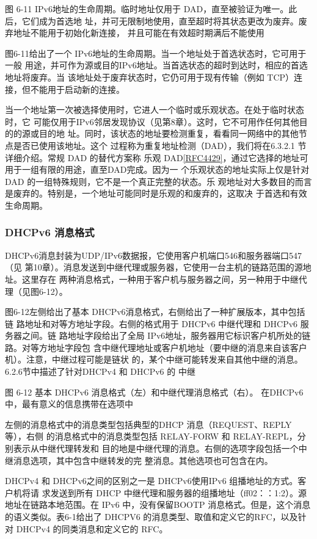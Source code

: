 图 6-11
IPv6地址的生命周期。临时地址仅用于 DAD，直至被验证为唯一。此后，它们成为首选地
址，并可无限制地使用，直至超时将其状态更改为废弃。废弃地址不能用于初始化新连接，
并且可能在有效超时期满后不能使用

图6-11给出了一个 IPv6地址的生命周期。当一个地址处于首选状态时，它可用于一般
用途，并可作为源或目的IPv6地址。当首选状态的超时到达时，相应的首选地址将废弃。当
该地址处于废弃状态时，它仍可用于现有传输（例如 TCP）连接，但不能用于启动新的连接。

当一个地址第一次被选择使用时，它进人一个临时或乐观状态。在处于临时状态时，它
可能仅用于IPv6邻居发现协议（见第8章）。这时，它不可用作任何其他目的的源或目的地
址。同时，该状态的地址要检测重复，看看同一网络中的其他节点是否已使用该地址。这个
过程称为重复地址检测（DAD），我们将在6.3.2.1 节详细介绍。常规 DAD 的替代方案称
乐观 DAD\href{https://www.rfc-editor.org/rfc/rfc4429}{\href{https://www.rfc-editor.org/rfc/rfc4429}{[RFC4429]}}，通过它选择的地址可用于一组有限的用途，直至DAD完成。因为一
个乐观状态的地址实际上仅是针对 DAD 的一组特殊规则，它不是一个真正完整的状态。乐
观地址对大多数目的而言是废弃的。特别是，一个地址可能同时是乐观的和废弃的，这取决
于首选和有效生命周期。

\subsubsection{DHCPv6 消息格式}
DHCPv6消息封装为UDP/IPv6数据报，它使用客户机端口546和服务器端口547（见
第10章）。消息发送到中继代理或服务器，它使用一台主机的链路范围的源地址。这里存在
两种消息格式，一种用于客户机与服务器之间，另一种用于中继代理（见图6-12）。

图6-12左侧给出了基本 DHCPv6消息格式，右侧给出了一种扩展版本，其中包括链
路地址和对等方地址字段。右侧的格式用于 DHCPv6 中继代理和 DHCPv6 服务器之间。链
路地址字段给出了全局 IPv6地址，服务器用它标识客户机所处的链路。对等方地址字段包
含中继代理地址或客户机地址（要中继的消息来自该客户机）。注意，中继过程可能是链状
的，某个中继可能转发来自其他中继的消息。6.2.6节中描述了针对DHCPv4 和 DHCPv6 的
中继

图 6-12
基本 DHCPv6 消息格式（左）和中继代理消息格式（右）。
在DHCPv6中，最有意义的信息携带在选项中

左侧的消息格式中的消息类型包括典型的DHCP 消息（REQUEST、REPLY 等），右侧
的消息格式中的消息类型包括 RELAY-FORW 和 RELAY-REPL，分别表示从中继代理转发和
目的地是中继代理的消息。右侧的选项字段包括一个中继消息选项，其中包含中继转发的完
整消息。其他选项也可包含在内。

DHCPv4 和 DHCPv6之间的区别之一是 DHCPv6使用IPv6 组播地址的方式。客户机将请
求发送到所有 DHCP 中继代理和服务器的组播地址（ff02：：1:2）。源地址在链路本地范围。在
IPv6 中，没有保留BOOTP 消息格式。但是，这个消息的语义类似。表6-1给出了 DHCPV6
的消息类型、取值和定义它的RFC，以及针对 DHCPv4 的同类消息和定义它的 RFC。

